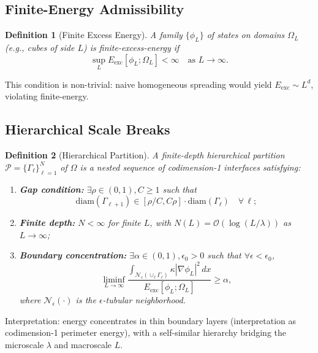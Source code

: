 \documentclass{article}
\newtheorem{definition}{Definition}
\begin{document}
\subsection{Finite-Energy Admissibility}

\begin{definition}[Finite Excess Energy]
A family $\{\phi_L\}$ of states on domains $\Omega_L$ (e.g., cubes of side $L$) is \emph{finite-excess-energy} if
\begin{equation}
\sup_{L} E_{\text{exc}}[\phi_L;\Omega_L] < \infty \quad\text{as } L\to\infty.
\end{equation}
\end{definition}

This condition is non-trivial: naive homogeneous spreading would yield $E_{\text{exc}}\sim L^d$, violating finite-energy.

\subsection{Hierarchical Scale Breaks}

\begin{definition}[Hierarchical Partition]
A finite-depth hierarchical partition $\mathcal{P}=\{\Gamma_\ell\}_{\ell=1}^{N}$ of $\Omega$ is a nested sequence of codimension-1 interfaces satisfying:
\begin{enumerate}
    \item \textbf{Gap condition:} $\exists \rho\in(0,1), C\ge 1$ such that
    \begin{equation}
    \text{diam}(\Gamma_{\ell+1}) \in [\rho/C, C\rho]\cdot \text{diam}(\Gamma_{\ell}) \quad \forall\,\ell;
    \end{equation}
    \item \textbf{Finite depth:} $N<\infty$ for finite $L$, with $N(L)=\mathcal{O}(\log(L/\lambda))$ as $L\to\infty$;
    \item \textbf{Boundary concentration:} $\exists\alpha\in(0,1), \epsilon_0>0$ such that $\forall\epsilon<\epsilon_0$,
    \begin{equation}
    \liminf_{L\to\infty} \frac{ \int_{\mathcal{N}_\epsilon(\cup_\ell \Gamma_\ell)} \kappa|\nabla \phi_L|^2 \,dx }{ E_{\text{exc}}[\phi_L;\Omega_L] } \ge \alpha,
    \end{equation}
    where $\mathcal{N}_\epsilon(\cdot)$ is the $\epsilon$-tubular neighborhood.
\end{enumerate}
\end{definition}

Interpretation: energy concentrates in thin boundary layers (interpretation as codimension-1 perimeter energy), with a self-similar hierarchy bridging the microscale $\lambda$ and macroscale $L$.
\end{document}
